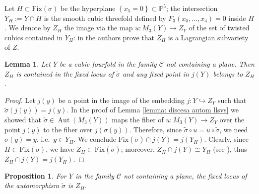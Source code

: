 \documentclass{amsart}
\newtheorem{prop}[theorem]{Proposition}
\newtheorem{lemma}[theorem]{Lemma}
\theoremstyle{definition}
\newcommand{\ra}{\rightarrow}
\newcommand{\coloneqq}{:=}
\DeclareMathOperator{\aut}{Aut}
\begin{document}
Let $H \subset \textrm{Fix}(\sigma)$ be the hyperplane $\left\{x_5 = 0 \right\} \subset \mathbb{P}^5$; the intersection $Y_H \coloneqq Y \cap H$ is the smooth cubic threefold defined by $F_3(x_0, \ldots, x_4) = 0$ inside $H$. We denote by $Z_H$ the image via the map $u: M_3(Y) \ra Z_Y$ of the set of twisted cubics contained in $Y_H$: in \cite[Proposition 2.9]{shinder_soldatenkov} the authors prove that $Z_H$ is a Lagrangian subvariety of $Z$.

\begin{lemma}\label{lemma: Z_H in fixed locus}
Let $Y$ be a cubic fourfold in the family $\mathcal{C}$ not containing a plane. Then $Z_H$ is contained in the fixed locus of $\tilde{\sigma}$ and any fixed point in $j(Y)$ belongs to $Z_H$.
\end{lemma}
\begin{proof}
Let $j(y)$ be a point in the image of the embedding $j: Y \hookrightarrow Z_Y$ such that $\tilde{\sigma}(j(y)) = j(y)$. In the proof of Lemma \ref{lemma: discesa autom llsvs} we showed that $\check{\sigma} \in \aut(M_3(Y))$ maps the fiber of $u: M_3(Y) \ra Z_Y$ over the point $j(y)$ to the fiber over $j(\sigma(y))$. Therefore, since $\tilde{\sigma} \circ u = u \circ \check{\sigma}$, we need $\sigma(y) = y$, i.e.\ $y \in Y_H$. We conclude $\textrm{Fix}(\tilde{\sigma}) \cap j(Y) = j(Y_H)$. Clearly, since $H \subset \textrm{Fix}(\sigma)$, we have $Z_H \subset \textrm{Fix}(\tilde{\sigma})$; moreover, $Z_H \cap j(Y) \cong Y_H$ (see \cite[\S 3]{shinder_soldatenkov}), thus $Z_H \cap j(Y) = j(Y_H)$.
\end{proof}

\begin{prop}\label{prop: fixed locus on llsvs}
For $Y$ in the family $\mathcal{C}$ not containing a plane, the fixed locus of the automorphism $\tilde{\sigma}$ is $Z_H$. 
\end{prop}
\end{document}

